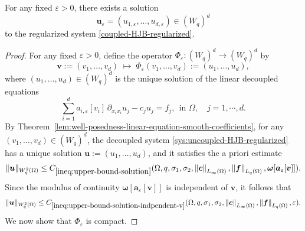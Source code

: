 \documentclass[final,onefignum,onetabnum]{mousaviart}
\begin{document}
	\begin{lemma}
		\label{lem:well-posedness-regularized-system}
		For any fixed $ \varepsilon > 0$, there exists a solution 
		\[
		\boldsymbol{u}_{\varepsilon} = (u_{1, \varepsilon}, \dots, u_{d, \varepsilon}) \in (W_q)^d
		\]
		to the regularized system \eqref{coupled-HJB-regularized}.
	\end{lemma}
	\begin{proof}
		For any fixed $\varepsilon > 0$, define the operator 
		$\Phi_{\varepsilon} : (W_q)^d \to (W_q)^d$ by
		\begin{equation}
			\label{ope:Phi-fixed-point}
			\boldsymbol{v} := (v_1, \dots, v_d) 
			\;\mapsto\;
			\Phi_{\varepsilon}(v_1, \dots, v_d) := (u_1, \dots, u_d),
		\end{equation}
		where $(u_1, \dots, u_d) \in (W_q)^d$ is the unique solution of the linear decoupled equations
		\begin{equation}
			\label{sys:uncoupled-HJB-regularized}
			\sum_{i=1}^{d} a_{i, \varepsilon}\left[ v_i \right] \, \partial_{x_i x_i} u_j
			- c_j u_j
			= f_j, 
			~~ \text{in } \Omega, 
			\quad
			j= 1, \cdots, d.
		\end{equation}
		By Theorem~\ref{lem:well-posedness-linear-equation-smooth-coefficients}, for any $(v_1, \dots, v_d) \in (W_q)^d$, the decoupled system \eqref{sys:uncoupled-HJB-regularized} has a unique solution 
		$\boldsymbol{u} := (u_1, \dots, u_d)$, and it satisfies the a priori estimate
		\begin{equation}
			\label{ineq:upper-bound-solution}
			\|\boldsymbol{u}\|_{W^{2}_q(\Omega)} 
			\le C_{\ref{ineq:upper-bound-solution}}(\Omega, q, \sigma_1, \sigma_2, \left\| \boldsymbol{c} \right\|_{L_\infty(\Omega)} , \left\|  \boldsymbol{f} \right\|_{L_q(\Omega)} ,
			\boldsymbol{\omega}[\boldsymbol{a}_{\varepsilon}[\boldsymbol{v}]] ).
		\end{equation}
		Since the modulus of continuity $\boldsymbol{\omega}[\boldsymbol{a}_{\varepsilon}[\boldsymbol{v}]]$ is independent of $\boldsymbol{v}$, it follows that
		\begin{equation}
			\label{ineq:upper-bound-solution-indpendent-v}
			\|\boldsymbol{u}\|_{W^{2}_q(\Omega)} 
			\le C_{\ref{ineq:upper-bound-solution-indpendent-v}}(\Omega, q , \sigma_1, \sigma_2, \left\| \boldsymbol{c} \right\|_{L_\infty(\Omega)}, \left\| \boldsymbol{f} \right\|_{L_q(\Omega)}, 
			\varepsilon).
		\end{equation}
		We now show that $\Phi_{\varepsilon}$ is compact.  

\end{proof}
\end{document}

